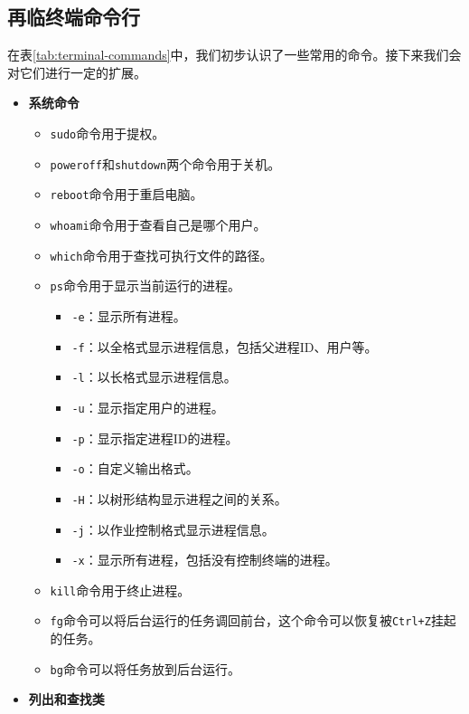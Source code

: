 \documentclass[../main.tex]{subfiles}
\begin{document}
\subsection{再临终端命令行}

在表\ref{tab:terminal-commands}中，我们初步认识了一些常用的命令。接下来我们会对它们进行一定的扩展。

\begin{itemize}
  \item \textbf{系统命令}
    \begin{itemize}
      \item \texttt{sudo}命令用于提权。
      \item \texttt{poweroff}和\texttt{shutdown}两个命令用于关机。
      \item \texttt{reboot}命令用于重启电脑。
      \item \texttt{whoami}命令用于查看自己是哪个用户。
      \item \texttt{which}命令用于查找可执行文件的路径。
      \item \texttt{ps}命令用于显示当前运行的进程。
        \begin{itemize}
          \item \texttt{-e}：显示所有进程。
          \item \texttt{-f}：以全格式显示进程信息，包括父进程ID、用户等。
          \item \texttt{-l}：以长格式显示进程信息。
          \item \texttt{-u}：显示指定用户的进程。
          \item \texttt{-p}：显示指定进程ID的进程。
          \item \texttt{-o}：自定义输出格式。
          \item \texttt{-H}：以树形结构显示进程之间的关系。
          \item \texttt{-j}：以作业控制格式显示进程信息。
          \item \texttt{-x}：显示所有进程，包括没有控制终端的进程。
        \end{itemize}
      \item \texttt{kill}命令用于终止进程。
      \item \texttt{fg}命令可以将后台运行的任务调回前台，这个命令可以恢复被\texttt{Ctrl+Z}挂起的任务。
      \item \texttt{bg}命令可以将任务放到后台运行。
    \end{itemize}
  \item \textbf{列出和查找类}
    \begin{itemize}

\end{itemize}
\end{itemize}
\end{document}
